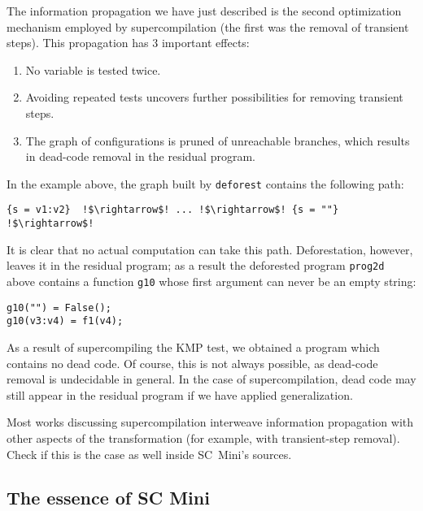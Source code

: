 The information propagation we have just described is the second optimization mechanism 
employed by supercompilation (the first was the removal of transient steps).
This propagation has 3 important effects:
\begin{enumerate}
  \item No variable is tested twice.
  \item Avoiding repeated tests uncovers further possibilities for removing transient steps.
  \item The graph of configurations is pruned of unreachable branches, which results in dead-code 
  removal in the residual program.
\end{enumerate}
In the example above, the graph built by \texttt{deforest} contains the following path:
\begin{lstlisting}[language=sll,escapechar=!]
{s = v1:v2}  !$\rightarrow$! ... !$\rightarrow$! {s = ""} !$\rightarrow$!
\end{lstlisting}
It is clear that no actual computation can take this path. 
Deforestation, however, leaves it in the residual program;
as a result the deforested program \texttt{prog2d} above contains a function
\texttt{g10} whose first argument can never be an empty string:
\begin{lstlisting}[language=sll]
g10("") = False();
g10(v3:v4) = f1(v4);
\end{lstlisting}

As a result of supercompiling the KMP test, we obtained a program which contains no dead code.
Of course, this is not always possible, as dead-code removal is undecidable in general.
In the case of supercompilation, dead code may still appear in the residual program
if we have applied generalization.

\begin{exercise}
Most works discussing supercompilation interweave information propagation with other
aspects of the transformation (for example, with transient-step removal).
Check if this is the case as well inside SC~Mini's sources.
\end{exercise}

\subsection{The essence of SC Mini}

